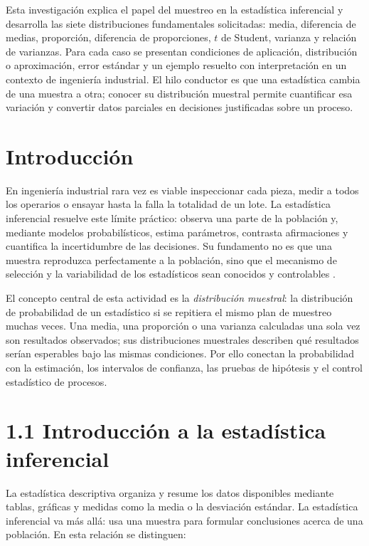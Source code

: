 \begin{abstractd}
Esta investigación explica el papel del muestreo en la estadística inferencial y desarrolla las siete distribuciones fundamentales solicitadas: media, diferencia de medias, proporción, diferencia de proporciones, $t$ de Student, varianza y relación de varianzas. Para cada caso se presentan condiciones de aplicación, distribución o aproximación, error estándar y un ejemplo resuelto con interpretación en un contexto de ingeniería industrial. El hilo conductor es que una estadística cambia de una muestra a otra; conocer su distribución muestral permite cuantificar esa variación y convertir datos parciales en decisiones justificadas sobre un proceso.
\end{abstractd}

\templateIndex

\section{Introducción}
En ingeniería industrial rara vez es viable inspeccionar cada pieza, medir a todos los operarios o ensayar hasta la falla la totalidad de un lote. La estadística inferencial resuelve este límite práctico: observa una parte de la población y, mediante modelos probabilísticos, estima parámetros, contrasta afirmaciones y cuantifica la incertidumbre de las decisiones. Su fundamento no es que una muestra reproduzca perfectamente a la población, sino que el mecanismo de selección y la variabilidad de los estadísticos sean conocidos y controlables \citep{montgomery2018,walpole2012}.

El concepto central de esta actividad es la \emph{distribución muestral}: la distribución de probabilidad de un estadístico si se repitiera el mismo plan de muestreo muchas veces. Una media, una proporción o una varianza calculadas una sola vez son resultados observados; sus distribuciones muestrales describen qué resultados serían esperables bajo las mismas condiciones. Por ello conectan la probabilidad con la estimación, los intervalos de confianza, las pruebas de hipótesis y el control estadístico de procesos.

\section{1.1 Introducción a la estadística inferencial}
La estadística descriptiva organiza y resume los datos disponibles mediante tablas, gráficas y medidas como la media o la desviación estándar. La estadística inferencial va más allá: usa una muestra para formular conclusiones acerca de una población. En esta relación se distinguen:

